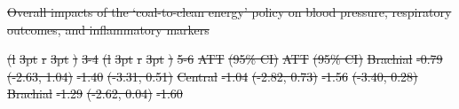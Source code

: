 \documentclass[
  letterpaper,
  DIV=11,
  numbers=noendperiod]{scrartcl}
\makeatletter
\renewenvironment{table}%
   {\renewcommand\familydefault\sfdefault
    \@float{table}}
   {\end@float}
\providecommand{\DIFdeltex}[1]{{\protect\color{red}\sout{#1}}}                      %
\providecommand{\DIFdelbegin}{} %
\providecommand{\DIFdelend}{} %
\providecommand{\DIFdelFL}[1]{\DIFdel{#1}} %
\providecommand{\DIFdelbeginFL}{} %
\providecommand{\DIFdelendFL}{} %
\providecommand{\DIFdel}[1]{\texorpdfstring{\DIFdeltex{#1}}{}} %
\newcommand{\DIFscaledelfig}{0.5}
\newlength{\DIFdelgraphicswidth} %
\newlength{\DIFdelgraphicsheight} %
\newcommand{\DIFdelincludegraphics}[2][]{%
\sbox{\DIFdelgraphicsbox}{\DIFOincludegraphics[#1]{#2}}%
\settoboxwidth{\DIFdelgraphicswidth}{\DIFdelgraphicsbox} %
\settoboxtotalheight{\DIFdelgraphicsheight}{\DIFdelgraphicsbox} %
\scalebox{\DIFscaledelfig}{%
\parbox[b]{\DIFdelgraphicswidth}{\usebox{\DIFdelgraphicsbox}\\[-\baselineskip] \rule{\DIFdelgraphicswidth}{0em}}\llap{\resizebox{\DIFdelgraphicswidth}{\DIFdelgraphicsheight}{%
\setlength{\unitlength}{\DIFdelgraphicswidth}%
\begin{picture}(1,1)%
\thicklines\linethickness{2pt} %
{\color[rgb]{1,0,0}\put(0,0){\framebox(1,1){}}}%
{\color[rgb]{1,0,0}\put(0,0){\line( 1,1){1}}}%
{\color[rgb]{1,0,0}\put(0,1){\line(1,-1){1}}}%
\end{picture}%
}\hspace*{3pt}}} %
} %
\DeclareRobustCommand{\DIFdelbegin}{\DIFOdelbegin \let\includegraphics\DIFdelincludegraphics} %
\DeclareRobustCommand{\DIFdelend}{\DIFOaddend \let\includegraphics\DIFOincludegraphics} %
\DeclareRobustCommand{\DIFdelbeginFL}{\DIFOdelbeginFL \let\includegraphics\DIFdelincludegraphics} %
\DeclareRobustCommand{\DIFdelendFL}{\DIFOaddendFL \let\includegraphics\DIFOincludegraphics} %
\makeatother
\begin{document}
\DIFdelbegin %
\DIFdelend \begin{table}
\DIFdelbeginFL %
{%
\DIFdelFL{Overall impacts of the `coal-to-clean energy' policy on blood pressure,
respiratory outcomes, and inflammatory markers }}%
\DIFdelendFL 

\DIFdelbeginFL %
\DIFdelFL{(l}%
\DIFdelFL{3pt}%
\DIFdelFL{r}%
\DIFdelFL{3pt}%
\DIFdelFL{)}%
\DIFdelFL{3-4}%
\DIFdelFL{(l}%
\DIFdelFL{3pt}%
\DIFdelFL{r}%
\DIFdelFL{3pt}%
\DIFdelFL{)}%
\DIFdelFL{5-6}%
\DIFdelFL{ATT }%
\DIFdelFL{(95\% CI) }%
\DIFdelFL{ATT }%
\DIFdelFL{(95\% CI)}%
\DIFdelFL{\hspace{1em} }%
\DIFdelFL{Brachial }%
\DIFdelFL{-0.79 }%
\DIFdelFL{(-2.63, 1.04) }%
\DIFdelFL{-1.40 }%
\DIFdelFL{(-3.31, 0.51)}%
\DIFdelFL{Central }%
\DIFdelFL{-1.04 }%
\DIFdelFL{(-2.82, 0.73) }%
\DIFdelFL{-1.56 }%
\DIFdelFL{(-3.40, 0.28)}%
\DIFdelFL{\hspace{1em} }%
\DIFdelFL{Brachial }%
\DIFdelFL{-1.29 }%
\DIFdelFL{(-2.62, 0.04) }%
\DIFdelFL{-1.60 }%

\end{table}
\end{document}
